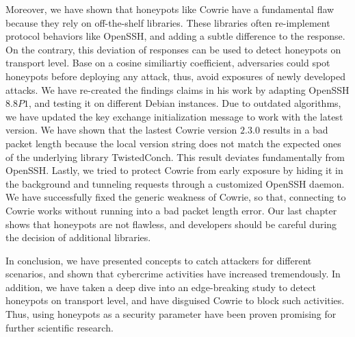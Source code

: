 Moreover, we have shown that honeypots like Cowrie have a fundamental flaw because they rely on off-the-shelf libraries.
These libraries often re-implement protocol behaviors like OpenSSH, and adding a subtle difference to the response.
On the contrary, this deviation of responses can be used to detect honeypots on transport level.
Base on a cosine similiartiy coefficient, adversaries could spot honeypots before deploying any attack, thus, avoid exposures of newly developed attacks.
We have re-created the findings \citet{vetterl2020} claims in his work by adapting OpenSSH $8.8P1$, and testing it on different Debian instances.
Due to outdated algorithms, we have updated the key exchange initialization message to work with the latest version.
We have shown that the lastest Cowrie version $2.3.0$ results in a bad packet length because the local version string does not match the expected ones of the underlying library TwistedConch.
This result deviates fundamentally from OpenSSH.
Lastly, we tried to protect Cowrie from early exposure by hiding it in the background and tunneling requests through a customized OpenSSH daemon.
We have successfully fixed the generic weakness of Cowrie, so that, connecting to Cowrie works without running into a bad packet length error.
Our last chapter shows that honeypots are not flawless, and developers should be careful during the decision of additional libraries.

In conclusion, we have presented concepts to catch attackers for different scenarios, and shown that cybercrime activities have increased tremendously.
In addition, we have taken a deep dive into an edge-breaking study to detect honeypots on transport level, and have disguised Cowrie to block such activities.
Thus, using honeypots as a security parameter have been proven promising for further scientific research.
